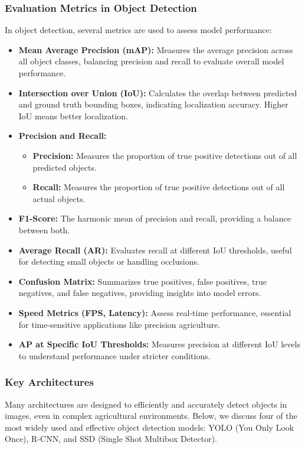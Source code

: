 \subsubsection{Evaluation Metrics in Object Detection}    
In object detection, several metrics are used to assess model performance:
\begin{itemize}
    \item \textbf{Mean Average Precision (mAP):} Measures the average precision across all object classes, balancing precision and recall to evaluate overall model performance.
    \item \textbf{Intersection over Union (IoU):} Calculates the overlap between predicted and ground truth bounding boxes, indicating localization accuracy. Higher IoU means better localization.
    \item \textbf{Precision and Recall:}
    \begin{itemize}
        \item \textbf{Precision:} Measures the proportion of true positive detections out of all predicted objects.
        \item \textbf{Recall:} Measures the proportion of true positive detections out of all actual objects.
    \end{itemize}
    \item \textbf{F1-Score:} The harmonic mean of precision and recall, providing a balance between both.
    \item \textbf{Average Recall (AR):} Evaluates recall at different IoU thresholds, useful for detecting small objects or handling occlusions.
    \item \textbf{Confusion Matrix:} Summarizes true positives, false positives, true negatives, and false negatives, providing insights into model errors.
    \item \textbf{Speed Metrics (FPS, Latency):} Assess real-time performance, essential for time-sensitive applications like precision agriculture.
    \item \textbf{AP at Specific IoU Thresholds:} Measures precision at different IoU levels to understand performance under stricter conditions.
\end{itemize}

\subsubsection{Key Architectures}
Many architectures are designed to efficiently and accurately detect objects in images, even in complex agricultural environments. Below, we discuss four of the most widely used and effective object detection models: YOLO (You Only Look Once), R-CNN, and SSD (Single Shot Multibox Detector). 

